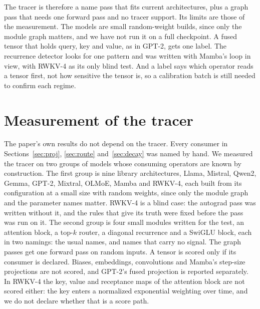 \documentclass[journal,onecolumn]{IEEEtran}
\begin{document}
The tracer is therefore a name pass that fits current architectures, plus a graph pass that needs
one forward pass and no tracer support. Its limits are those of the measurement. The models are
small random-weight builds, since only the module graph matters, and we have not run it on a full
checkpoint. A fused tensor that holds query, key and value, as in GPT-2, gets one label. The
recurrence detector looks for one pattern and was written with Mamba's loop in view, with RWKV-4
as its only blind test. And a label says which operator reads a tensor first, not how sensitive
the tensor is, so a calibration batch is still needed to confirm each regime.

\section{Measurement of the tracer}\label{app:tracer}

The paper's own results do not depend on the tracer. Every consumer in
Sections~\ref{sec:proj}, \ref{sec:route} and~\ref{sec:decay} was named by hand. We measured the tracer on two groups
of models whose consuming operators are known by construction. The first group is nine library
architectures, Llama, Mistral, Qwen2, Gemma, GPT-2, Mixtral, OLMoE, Mamba and RWKV-4, each built
from its configuration at a small size with random weights, since only the module graph and the
parameter names matter. RWKV-4 is a blind case: the autograd pass was written without it, and the
rules that give its truth were fixed before the pass was run on it. The second group is four small
modules written for the test, an attention block, a top-$k$ router, a diagonal recurrence and a
SwiGLU block, each in two namings: the usual names, and names that carry no signal. The graph
passes get one forward pass on random inputs. A tensor is scored only if its consumer is
declared. Biases, embeddings, convolutions and Mamba's step-size projections are not scored, and
GPT-2's fused projection is reported separately. In RWKV-4 the key, value and receptance maps of
the attention block are not scored either: the key enters a normalized exponential weighting over
time, and we do not declare whether that is a score path.
\end{document}
